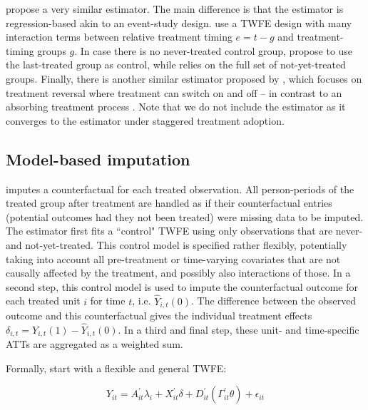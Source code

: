 \textcite{Sun.2021} propose a very similar estimator. The main difference is that the \textcite{Sun.2021} estimator is regression-based akin to an event-study design. \textcite{Sun.2021} use a TWFE design with many interaction terms between relative treatment timing $e = t - g$ and treatment-timing groups $g$. In case there is no never-treated control group, \textcite{Sun.2021} propose to use the last-treated group as control, while \textcite{Callaway.2020} relies on the full set of not-yet-treated groups.
Finally, there is another similar estimator proposed by \textcite{DeChaisemartin.2020}, which focuses on treatment reversal where treatment can switch on and off -- in contrast to an absorbing treatment process \cite[see also][]{Imai.2023}. Note that we do not include the  \textcite{DeChaisemartin.2020} estimator as it converges to the \textcite{Callaway.2020} estimator under staggered treatment adoption.



\subsection{Model-based imputation}

\textcite{Borusyak.2023} imputes a counterfactual for each treated observation. All person-periods of the treated group after treatment are handled as if their counterfactual entries (potential outcomes had they not been treated) were missing data to be imputed. The estimator first fits a ``control" TWFE using only observations that are never- and not-yet-treated. This control model is specified rather flexibly, potentially taking into account all pre-treatment or time-varying covariates that are not causally affected by the treatment, and possibly also interactions of those. In a second step, this control model is used to impute the counterfactual outcome for each treated unit $i$ for time $t$, i.e. $\hat{Y}_{i,t}(0)$. The difference between the observed outcome and this counterfactual gives the individual treatment effects $\delta_{i,t} = Y_{i,t} (1) - \hat{Y}_{i,t}(0)$. In a third and final step, these unit- and time-specific ATTs are aggregated as a weighted sum. 

Formally, start with a flexible and general TWFE:

\begin{equation}
\label{eqn:borusyak}
Y_{it} = A_{it}^{'}\lambda_i + X_{it}^{'}\delta + D_{it}^{'}(\Gamma_{it}^{'}\theta) + \epsilon_{it}  
\end{equation}

